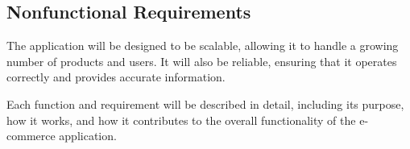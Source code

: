 \subsection{ Nonfunctional Requirements}
The application will be designed to be scalable, allowing it to handle a growing number of products and users. It will also be reliable, ensuring that it operates correctly and provides accurate information.

Each function and requirement will be described in detail, including its purpose, how it works, and how it contributes to the overall functionality of the e-commerce application.